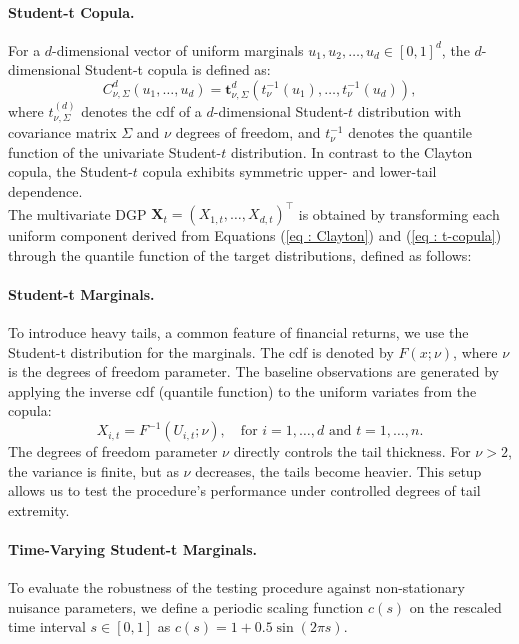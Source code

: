 \documentclass[12pt,a4paper]{article}
\theoremstyle{definition}
\theoremstyle{definition}
\theoremstyle{theorem}
\begin{document}
\paragraph{ Student-t Copula.} 
For a $d$-dimensional vector of uniform marginals $u_1, u_2, \dots, u_d \in [0, 1]^d$, the $d$-dimensional Student-t copula  is defined as:
\begin{equation}
    C_{\nu, \Sigma}^d(u_1, \dots, u_d) = \mathbf{t}_{\nu, \Sigma}^d \left( t_\nu^{-1}(u_1), \dots, t_\nu^{-1}(u_d) \right),
    \label{eq : t-copula}
\end{equation}
where $t_{\nu,\Sigma}^{(d)}$ denotes the cdf of a $d$-dimensional Student-$t$ distribution with covariance matrix $\Sigma$ and $\nu$ degrees of freedom, and $t_\nu^{-1}$ denotes the quantile function of the univariate Student-$t$ distribution. In contrast to the Clayton copula, the Student-$t$ copula exhibits symmetric upper- and lower-tail dependence. \\

The multivariate DGP $\mathbf{X}_t = (X_{1,t}, \dots, X_{d,t})^\top$ is obtained by transforming each uniform component derived from Equations (\ref{eq : Clayton}) and (\ref{eq : t-copula}) through the quantile function of the target distributions, defined as follows:

\paragraph{ Student-t Marginals.} 
To introduce heavy tails, a common feature of financial returns, we use the Student-t distribution for the marginals. The cdf is denoted by $F(x; \nu)$, where $\nu$ is the degrees of freedom parameter. The baseline observations are generated by applying the inverse cdf (quantile function) to the uniform variates from the copula:
\begin{equation} \label{eq:dgp}
    X_{i,t} = F^{-1}(U_{i,t}; \nu), \quad \text{for } i = 1, \dots, d \text{ and } t = 1, \dots, n.
\end{equation}
The degrees of freedom parameter $\nu$ directly controls the tail thickness. For $\nu > 2$, the variance is finite, but as $\nu$ decreases, the tails become heavier. This setup allows us to test the procedure's performance under controlled degrees of tail extremity.

\paragraph{ Time-Varying Student-t Marginals.}
To evaluate the robustness of the testing procedure against non-stationary nuisance parameters, we define a periodic scaling function $c(s)$ on the rescaled time interval $s \in [0,1]$ as $c(s) = 1 + 0.5 \sin(2\pi s)$.
\end{document}

